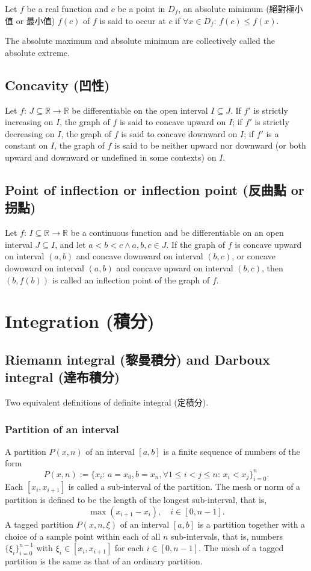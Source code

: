 \documentclass[a4paper,12pt]{report}
\begin{document}
Let $f$ be a real function and \( c \) be a point in \( D_f \), an absolute minimum (絕對極小值 or 最小值) \( f(c) \) of \(f\) is said to occur at $c$ if \( \forall x\in D_f:\, f(c) \leq f(x) \).

The absolute maximum and absolute minimum are collectively called the absolute extreme.
\subsection{Concavity (凹性)}
Let $f:\,J\subseteq\mathbb{R}\to\mathbb{R}$ be differentiable on the open interval $I\subseteq J$. If $f'$ is strictly increasing on $I$, the graph of $f$ is said to concave upward on $I$; if $f'$ is strictly decreasing on $I$, the graph of $f$ is said to concave downward on $I$; if $f'$ is a constant on $I$, the graph of $f$ is said to be neither upward nor downward (or both upward and downward or undefined in some contexts) on $I$.
\subsection{Point of inflection or inflection point (反曲點 or 拐點)}
Let $f:\,I\subseteq\mathbb{R}\to\mathbb{R}$ be a continuous function and be differentiable on an open interval $J\subseteq I$, and let $a<b<c\land a,b,c\in J$. If the graph of $f$ is concave upward on interval $(a,b)$ and concave downward on interval $(b,c)$, or concave downward on interval $(a,b)$ and concave upward on interval $(b,c)$, then $(b,f(b))$ is called an inflection point of the graph of $f$.




\section{Integration (積分)}
\subsection{Riemann integral (黎曼積分) and Darboux integral (達布積分)}
Two equivalent definitions of definite integral (定積分).
\subsubsection{Partition of an interval}
A partition $P(x, n)$ of an interval $[a, b]$ is a finite sequence of numbers of the form
\[P(x, n):=\{x_i:\,a=x_0,b=x_n,\forall 1\leq i<j\leq n:\,x_i<x_j\}_{i=0}^n.\]
Each $[x_i, x_{i+1}]$ is called a sub-interval of the partition. The mesh or norm of a partition is defined to be the length of the longest sub-interval, that is,
\[\max\left(x_{i+1}-x_{i}\right),\quad i\in [0,n-1].\]
A tagged partition $P(x,n,\xi)$ of an interval $[a,b]$ is a partition together with a choice of a sample point within each of all $n$ sub-intervals, that is, numbers $\{\xi_i\}_{i=0}^{n-1}$ with $\xi_i\in [x_i,x_{i+1}]$ for each $i\in [0,n-1]$. The mesh of a tagged partition is the same as that of an ordinary partition.
\end{document}
